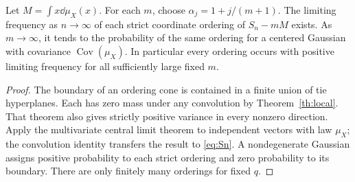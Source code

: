\begin{corollary}\label{cor:order}
Let \(M=\int x\dd\mu_X(x)\). For each \(m\), choose \(\alpha_j=1+j/(m+1)\). The limiting frequency as \(n\to\infty\) of each strict coordinate ordering of \(S_n-mM\) exists. As \(m\to\infty\), it tends to the probability of the same ordering for a centered Gaussian with covariance \(\operatorname{Cov}(\mu_X)\). In particular every ordering occurs with positive limiting frequency for all sufficiently large fixed \(m\).
\end{corollary}
\begin{proof}
The boundary of an ordering cone is contained in a finite union of tie hyperplanes. Each has zero mass under any convolution by Theorem~\ref{th:local}. That theorem also gives strictly positive variance in every nonzero direction. Apply the multivariate central limit theorem to independent vectors with law \(\mu_X\); the convolution identity transfers the result to \eqref{eq:Sn}. A nondegenerate Gaussian assigns positive probability to each strict ordering and zero probability to its boundary. There are only finitely many orderings for fixed \(q\).
\end{proof}
